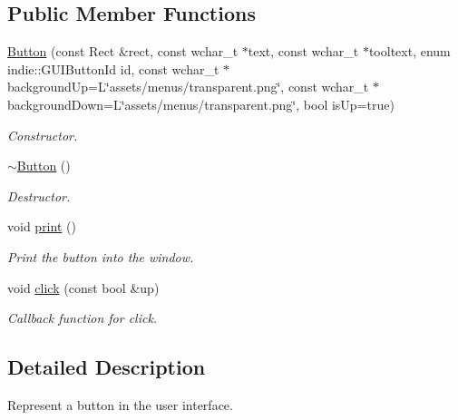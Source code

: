 \subsection*{Public Member Functions}
\begin{DoxyCompactItemize}
\item 
\hyperlink{classButton_a63f049e58e9871b0060446080ef5deba}{Button} (const Rect \&rect, const wchar\+\_\+t $\ast$text, const wchar\+\_\+t $\ast$tooltext, enum indie\+::\+G\+U\+I\+Button\+Id id, const wchar\+\_\+t $\ast$background\+Up=L\char`\"{}assets/menus/transparent.\+png\char`\"{}, const wchar\+\_\+t $\ast$background\+Down=L\char`\"{}assets/menus/transparent.\+png\char`\"{}, bool is\+Up=true)
\begin{DoxyCompactList}\small\item\em Constructor. \end{DoxyCompactList}\item 
\mbox{\label{classButton_a2a001eb9c3cc8ae54768a850dd345002}} 
\hyperlink{classButton_a2a001eb9c3cc8ae54768a850dd345002}{$\sim$\+Button} ()
\begin{DoxyCompactList}\small\item\em Destructor. \end{DoxyCompactList}\item 
\mbox{\label{classButton_a614921b7355d17e6074b44fa34862c6e}} 
void \hyperlink{classButton_a614921b7355d17e6074b44fa34862c6e}{print} ()
\begin{DoxyCompactList}\small\item\em Print the button into the window. \end{DoxyCompactList}\item 
\mbox{\label{classButton_aab1887f1acb0b960b6a7df8bad915551}} 
void \hyperlink{classButton_aab1887f1acb0b960b6a7df8bad915551}{click} (const bool \&up)
\begin{DoxyCompactList}\small\item\em Callback function for click. \end{DoxyCompactList}\end{DoxyCompactItemize}


\subsection{Detailed Description}
Represent a button in the user interface. 

